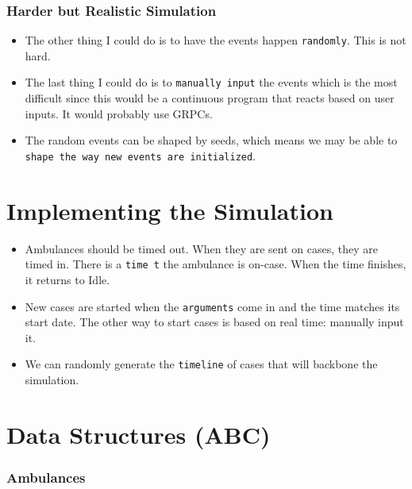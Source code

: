 \documentclass[11pt]{article}
\providecommand{\tightlist}{%
      \setlength{\itemsep}{0pt}\setlength{\parskip}{0pt}}
\begin{document}
\hypertarget{harder-but-realistic-simulation}{%
\subsubsection{Harder but Realistic
Simulation}\label{harder-but-realistic-simulation}}

\begin{itemize}
\item
  The other thing I could do is to have the events happen
  \texttt{randomly}. This is not hard.
\item
  The last thing I could do is to \texttt{manually\ input} the events
  which is the most difficult since this would be a continuous program
  that reacts based on user inputs. It would probably use GRPCs.
\item
  The random events can be shaped by seeds, which means we may be able
  to \texttt{shape\ the\ way\ new\ events\ are\ initialized}.
\end{itemize}

    \hypertarget{implementing-the-simulation}{%
\section{Implementing the
Simulation}\label{implementing-the-simulation}}

\begin{itemize}
\tightlist
\item
  Ambulances should be timed out. When they are sent on cases, they are
  timed in. There is a \texttt{time\ t} the ambulance is on-case. When
  the time finishes, it returns to Idle.
\item
  New cases are started when the \texttt{arguments} come in and the time
  matches its start date. The other way to start cases is based on real
  time: manually input it.
\item
  We can randomly generate the \texttt{timeline} of cases that will
  backbone the simulation.
\end{itemize}

    \hypertarget{data-structures-abc}{%
\section{Data Structures (ABC)}\label{data-structures-abc}}

\hypertarget{ambulances}{%
\subsubsection{Ambulances}\label{ambulances}}
\end{document}
